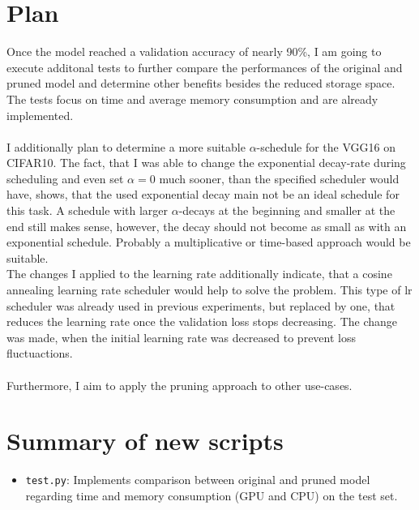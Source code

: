 \documentclass[10pt,twocolumn,letterpaper]{article}
\begin{document}
\section{Plan}
Once the model reached a validation accuracy of nearly 90\%, I am going to execute additonal tests to further compare the performances of the original and pruned model and determine other benefits besides the reduced storage space.
The tests focus on time and average memory consumption and are already implemented.\\\\
I additionally plan to determine a more suitable $\alpha$-schedule for the VGG16 on CIFAR10.
The fact, that I was able to change the exponential decay-rate during scheduling and even set $\alpha=0$ much sooner, than the specified scheduler would have, shows, that the used exponential decay main not be an ideal schedule for this task.
A schedule with larger $\alpha$-decays at the beginning and smaller at the end still makes sense, however, the decay should not become as small as with an exponential schedule.
Probably a multiplicative or time-based approach would be suitable.\\
The changes I applied to the learning rate additionally indicate, that a cosine annealing learning rate scheduler would help to solve the problem.
This type of lr scheduler was already used in previous experiments, but replaced by one, that reduces the learning rate once the validation loss stops decreasing.
The change was made, when the initial learning rate was decreased to prevent loss fluctuactions.\\\\
Furthermore, I aim to apply the pruning approach to other use-cases.

\section{Summary of new scripts}
\begin{itemize}
	\item \texttt{test.py}:
		Implements comparison between original and pruned model regarding time and memory consumption (GPU and CPU) on the test set.
\end{itemize}
{\small


}
\end{document}
